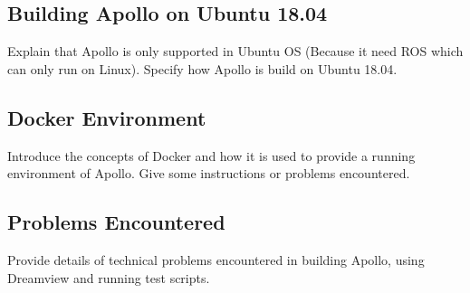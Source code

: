 \subsection{Building Apollo on Ubuntu 18.04}
Explain that Apollo is only supported in Ubuntu OS (Because it need ROS which can only run on Linux). Specify how Apollo is build on Ubuntu 18.04. 

\subsection{Docker Environment}
Introduce the concepts of Docker and how it is used to provide a running environment of Apollo. Give some instructions or problems encountered.

\subsection{Problems Encountered}
Provide details of technical problems encountered in building Apollo, using Dreamview and running test scripts.